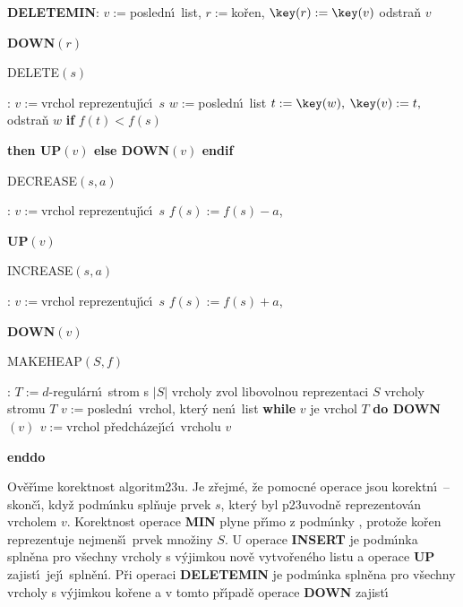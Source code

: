 \documentclass[a4paper,12pt]{article}
\begin{document}
{\bf DELETEMIN}:\newline 
$v:=$posledn\'\i\ list, $r:=$ko\v ren, $\key(r):=\key(v)$\newline 
odstra\v n $v$\newline 
{\bf DOWN$(r)$
\bigskip

DELETE$(s)$}:\newline 
$v:=$vrchol reprezentuj\'\i c\'\i\ $s$\newline 
$w:=$posledn\'\i\ list\newline 
$t:=\key(w),$ $\key(v):=t,$ odstra\v n $w$\newline 
{\bf if} $f(t)<f(s)$ {\bf then UP$(v)$ else DOWN$(v)$ endif
\bigskip

DECREASE$(s,a)$}:\newline 
$v:=$vrchol reprezentuj\'\i c\'\i\ $s$\newline 
$f(s):=f(s)-a$, {\bf UP$(v)$
\bigskip

INCREASE$(s,a)$}:\newline 
$v:=$vrchol reprezentuj\'\i c\'\i\ $s$\newline 
$f(s):=f(s)+a$, {\bf DOWN$(v)$
\bigskip

MAKEHEAP$(S,f)$}:\newline 
$T:=d$-regul\'arn\'\i\ strom s $|S|$ vrcholy\newline 
zvol libovolnou reprezentaci $S$ vrcholy stromu $T$\newline 
$v:=$posledn\'\i\ vrchol, kter\'y nen\'\i\ list\newline 
{\bf while} $v$ je vrchol $T$ {\bf do\newline 
\phantom{{\rm ---}}DOWN$(v)$\newline 
\phantom{{\rm ---}}$v:=$}vrchol p\v redch\'azej\'\i c\'\i\ 
vrcholu $v$\newline 
{\bf enddo
\bigskip

}\flushpar Ov\v e\v r\'\i me korektnost algoritm\accent23u.  Je z\v rejm\'e, \v ze 
pomocn\'e operace jsou korektn\'\i\ -- skon\v c\'\i , kdy\v z podm\'\i nku 
\thetag{usp} spl\v nuje prvek $s$, kter\'y byl p\accent23uvodn\v e 
reprezentov\'an vrcholem $v$. Korektnost operace {\bf MIN} plyne 
p\v r\'\i mo z podm\'\i nky , proto\v ze ko\v ren reprezentuje nejmen\v s\'\i\ 
prvek mno\v ziny $S$. U operace {\bf INSERT} je podm\'\i nka 
 spln\v ena pro v\v sechny vrcholy s v\'yjimkou nov\v e 
vytvo\v ren\'eho listu a operace {\bf UP} zajist\'\i\ jej\'\i\ spln\v en\'\i .  P\v ri 
operaci {\bf DELETEMIN} je pod\-m\'\i n\-ka \thetag{usp} spln\v ena pro 
v\v sechny vrcholy s v\'yjimkou ko\v rene a v tomto p\v r\'\i pad\v e ope\-race {\bf DOWN} zajist\'\i\ 
\end{document}

